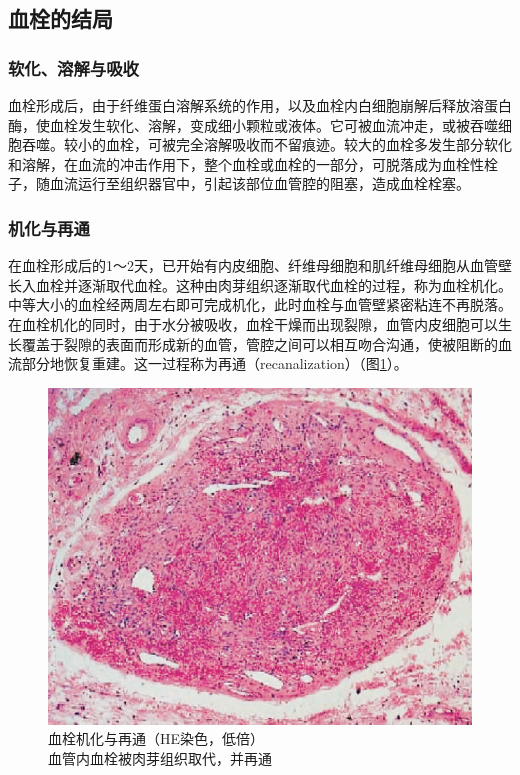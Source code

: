 \subsection{血栓的结局}

\subsubsection{软化、溶解与吸收}

血栓形成后，由于纤维蛋白溶解系统的作用，以及血栓内白细胞崩解后释放溶蛋白酶，使血栓发生软化、溶解，变成细小颗粒或液体。它可被血流冲走，或被吞噬细胞吞噬。较小的血栓，可被完全溶解吸收而不留痕迹。较大的血栓多发生部分软化和溶解，在血流的冲击作用下，整个血栓或血栓的一部分，可脱落成为血栓性栓子，随血流运行至组织器官中，引起该部位血管腔的阻塞，造成血栓栓塞。

\subsubsection{机化与再通}

在血栓形成后的1～2天，已开始有内皮细胞、纤维母细胞和肌纤维母细胞从血管壁长入血栓并逐渐取代血栓。这种由肉芽组织逐渐取代血栓的过程，称为血栓机化。中等大小的血栓经两周左右即可完成机化，此时血栓与血管壁紧密粘连不再脱落。在血栓机化的同时，由于水分被吸收，血栓干燥而出现裂隙，血管内皮细胞可以生长覆盖于裂隙的表面而形成新的血管，管腔之间可以相互吻合沟通，使被阻断的血流部分地恢复重建。这一过程称为再通（recanalization）（图\ref{fig3-8}）。

\begin{figure}[!htbp]
  \centering
  \includegraphics{./images/Image00042.jpg}
  \caption{血栓机化与再通（HE染色，低倍） \\ {\small 血管内血栓被肉芽组织取代，并再通}}
  \label{fig3-8}
\end{figure}



